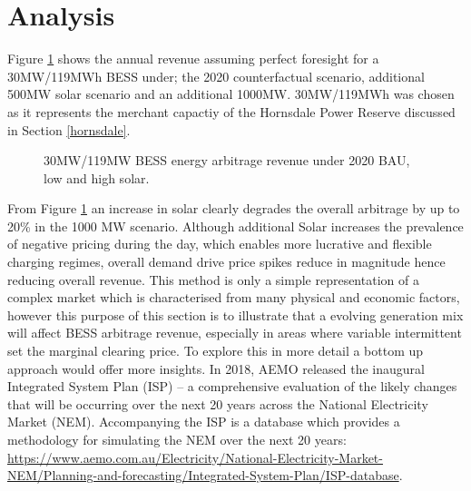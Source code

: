 \section{ Analysis }
Figure \ref{fig:bess_w_solar} shows the annual revenue assuming perfect foresight for a 30MW/119MWh BESS under; the 2020 counterfactual scenario, additional 500MW solar scenario and  an additional 1000MW. 30MW/119MWh was chosen as it represents the merchant capactiy of the Hornsdale Power Reserve discussed in Section \ref{hornsdale}.
\begin{figure}[H]
    \centering
    \caption{30MW/119MW BESS energy arbitrage revenue under 2020 BAU, low and high solar.}
    \label{fig:bess_w_solar}
\end{figure}
From Figure \ref{fig:bess_w_solar} an increase in solar clearly degrades the overall arbitrage by up to 20\% in the 1000 MW scenario. Although additional Solar increases the prevalence of negative pricing during the day, which enables more lucrative and flexible charging regimes, overall demand drive price spikes reduce in magnitude hence reducing overall revenue.
\newline
\newline
This method is only a simple representation of a complex market which is characterised from many physical and economic factors, however this purpose of this section is to illustrate that a evolving generation mix will affect BESS arbitrage revenue, especially in areas where variable intermittent set the marginal clearing price. To explore this in more detail a bottom up approach would offer more insights. In 2018, AEMO released the inaugural Integrated System Plan (ISP) – a comprehensive evaluation of the likely changes that will be occurring over the next 20 years across the National Electricity Market (NEM). Accompanying the ISP is a database which provides a methodology for simulating the NEM over the next 20 years: \url{https://www.aemo.com.au/Electricity/National-Electricity-Market-NEM/Planning-and-forecasting/Integrated-System-Plan/ISP-database}. 